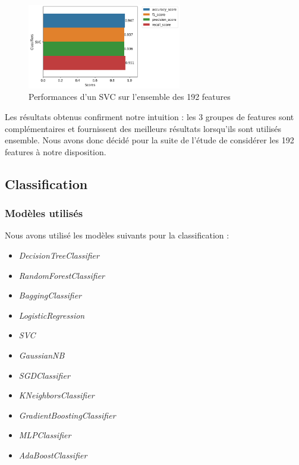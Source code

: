 \documentclass{article}
\begin{document}
\begin{figure}[h]
    \centering
    \includegraphics[width=0.6\textwidth]{img/svc_perfs_all_data.png}
    \caption{Performances d'un SVC sur l'ensemble des 192 features}
\end{figure}

\newpage
Les résultats obtenus confirment notre intuition : les 3 groupes de features sont complémentaires
et fournissent des meilleurs résultats lorsqu'ils sont utilisés ensemble. Nous avons donc
décidé pour la suite de l'étude de considérer les 192 features à notre disposition.

\subsection{Classification}

\subsubsection{Modèles utilisés}
Nous avons utilisé les modèles suivants pour la classification :
\begin{itemize}
    \item \textit{DecisionTreeClassifier} \cite{DTC}
    \item \textit{RandomForestClassifier} \cite{RFC}
    \item \textit{BaggingClassifier} \cite{BC}
    \item \textit{LogisticRegression} \cite{LR}
    \item \textit{SVC} \cite{SVC}
    \item \textit{GaussianNB} \cite{GNB}
    \item \textit{SGDClassifier} \cite{SGD}
    \item \textit{KNeighborsClassifier} \cite{KNN}
    \item \textit{GradientBoostingClassifier} \cite{GNB}
    \item \textit{MLPClassifier} \cite{MLP}
    \item \textit{AdaBoostClassifier} \cite{ABC}
\end{itemize}
\end{document}
